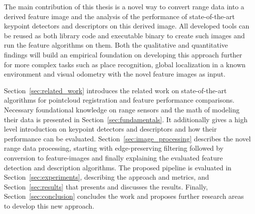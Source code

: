 The main contribution of this thesis is a novel way to convert range data into a derived feature image and the analysis of the performance of state-of-the-art keypoint detectors and descriptors on this derived image.
All developed tools can be reused as both library code and executable binary to create such images and run the feature algorithms on them.
Both the qualitative and quantitative findings will build an empirical foundation on developing this approach further for more complex tasks such as place recognition, global localization in a known environment and visual odometry with the novel feature images as input.

Section~\ref{sec:related_work} introduces the related work on state-of-the-art algorithms for pointcloud registration and feature performance comparisons.
Necessary foundational knowledge on range sensors and the math of modeling their data is presented in Section~\ref{sec:fundamentals}.
It additionally gives a high level introduction on keypoint detectors and descriptors and how their performance can be evaluated.
Section~\ref{sec:image_processing} describes the novel range data processing, starting with edge-preserving filtering followed by conversion to feature-images and finally explaining the evaluated feature detection and description algorithms.
The proposed pipeline is evaluated in Section~\ref{sec:experiments}, describing the approach and metrics, and Section~\ref{sec:results} that presents and discusses the results.
Finally, Section~\ref{sec:conclusion} concludes the work and proposes further research areas to develop this new approach.

